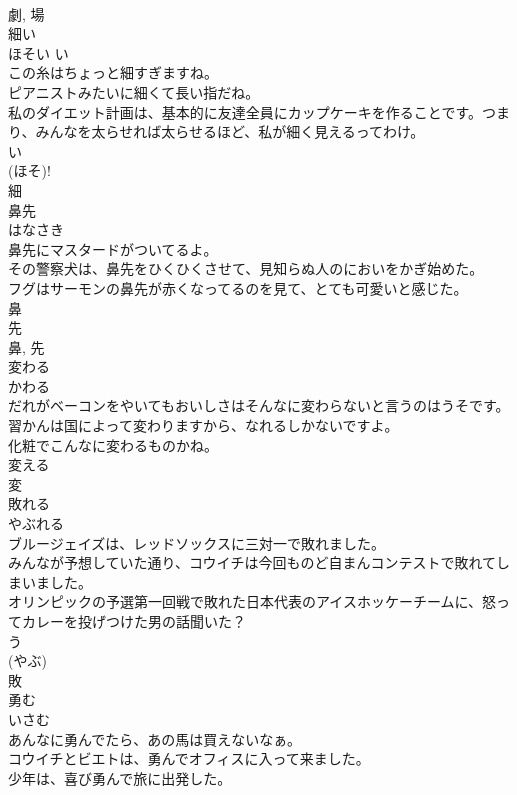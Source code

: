 \documentclass[8pt]{extreport}
\begin{document}
\begin{CJK}{UTF8}{min}
\\	劇, 場	
\\	細い	
\\	ほそい	い 
\\	この糸はちょっと細すぎますね。	
\\	ピアニストみたいに細くて長い指だね。	
\\	私のダイエット計画は、基本的に友達全員にカップケーキを作ることです。つまり、みんなを太らせれば太らせるほど、私が細く見えるってわけ。	
\\	い 
\\	(ほそ)! 
\\	細	
\\	鼻先	
\\	はなさき	
\\	鼻先にマスタードがついてるよ。	
\\	その警察犬は、鼻先をひくひくさせて、見知らぬ人のにおいをかぎ始めた。	
\\	フグはサーモンの鼻先が赤くなってるのを見て、とても可愛いと感じた。	
\\	鼻 
\\	先 
\\	鼻, 先	
\\	変わる	
\\	かわる	
\\	だれがベーコンをやいてもおいしさはそんなに変わらないと言うのはうそです。	
\\	習かんは国によって変わりますから、なれるしかないですよ。	
\\	化粧でこんなに変わるものかね。	
\\	変える 
\\	変	
\\	敗れる	
\\	やぶれる	
\\	ブルージェイズは、レッドソックスに三対一で敗れました。	
\\	みんなが予想していた通り、コウイチは今回ものど自まんコンテストで敗れてしまいました。	
\\	オリンピックの予選第一回戦で敗れた日本代表のアイスホッケーチームに、怒ってカレーを投げつけた男の話聞いた？	
\\	う 
\\	(やぶ) 
\\	敗	
\\	勇む	
\\	いさむ	
\\	あんなに勇んでたら、あの馬は買えないなぁ。	
\\	コウイチとビエトは、勇んでオフィスに入って来ました。	
\\	少年は、喜び勇んで旅に出発した。	

\end{CJK}
\end{document}
